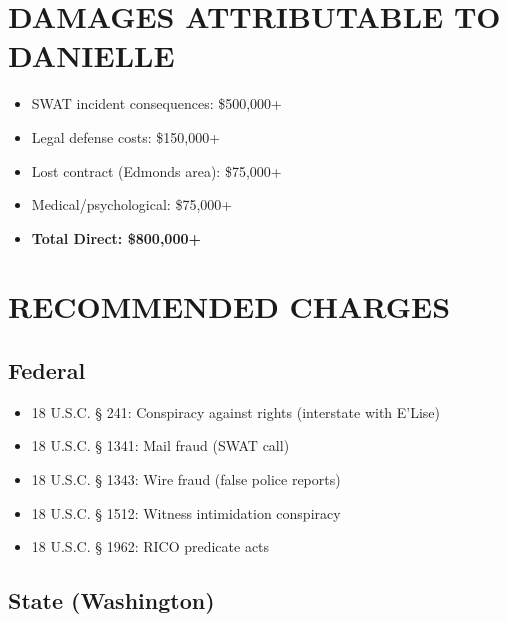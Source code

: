 \documentclass[12pt,oneside]{article}
\begin{document}
\section*{DAMAGES ATTRIBUTABLE TO DANIELLE}

\begin{itemize}

\item SWAT incident consequences: \$500,000+

\item Legal defense costs: \$150,000+

\item Lost contract (Edmonds area): \$75,000+

\item Medical/psychological: \$75,000+

\item \textbf{Total Direct: \$800,000+}

\end{itemize}

\section*{RECOMMENDED CHARGES}

\subsection*{Federal}

\begin{itemize}

\item 18 U.S.C. § 241: Conspiracy against rights (interstate with E'Lise)

\item 18 U.S.C. § 1341: Mail fraud (SWAT call)

\item 18 U.S.C. § 1343: Wire fraud (false police reports)

\item 18 U.S.C. § 1512: Witness intimidation conspiracy

\item 18 U.S.C. § 1962: RICO predicate acts

\end{itemize}

\subsection*{State (Washington)}
\end{document}
